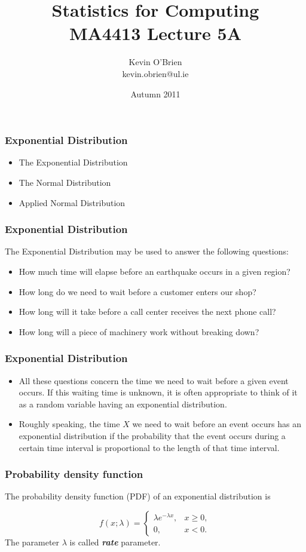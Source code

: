 \documentclass[a4]{beamer}
\title[MA4413]{Statistics for Computing \\ {\normalsize MA4413 Lecture 5A}}
\author[Kevin O'Brien]{Kevin O'Brien \\ {\scriptsize kevin.obrien@ul.ie}}
\date{Autumn 2011}
\institute[Maths \& Stats]{Dept. of Mathematics \& Statistics, \\ University \textit{of} Limerick}
\begin{document}
\begin{frame}
\titlepage
\end{frame}
\begin{frame}[fragile]
\frametitle{Exponential Distribution}
\begin{itemize}
\item The Exponential Distribution
\item The Normal Distribution
\item Applied Normal Distribution
\end{itemize}
\end{frame}

\begin{frame}[fragile]
\frametitle{Exponential Distribution}
The Exponential Distribution may be used to answer the following questions:
\begin{itemize}
\item How much time will elapse before an earthquake occurs in a given region?
\item How long do we need to wait before a customer enters our shop?
\item How long will it take before a call center receives the next phone call?
\item How long will a piece of machinery work without breaking down?
\end{itemize}
\end{frame}  

\begin{frame}[fragile]
\frametitle{Exponential Distribution}

\begin{itemize}
\item All these questions concern the time we need to wait before a given event occurs. If this waiting time is unknown, it is often appropriate to think of it as a random variable having an exponential distribution.
\item Roughly speaking, the time $X$ we need to wait before an event occurs has an exponential distribution if the probability that the event occurs during a certain time interval is proportional to the length of that time interval.

\end{itemize}
\end{frame}

\begin{frame}[fragile]
\frametitle{Probability density function}
The probability density function (PDF) of an exponential distribution is

\[
f(x;\lambda) = \begin{cases}
\lambda e^{-\lambda x}, & x \ge 0, \\
0, & x < 0.
\end{cases}\]
The parameter $\lambda$  is called \textbf{\emph{rate}} parameter.
\end{frame}
\end{document}
